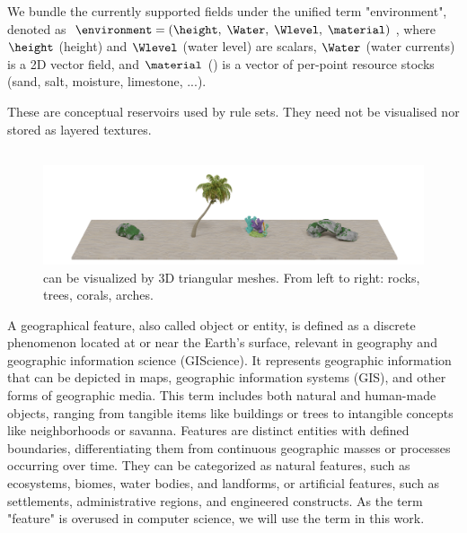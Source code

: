 We bundle the currently supported fields under the unified term "environment", denoted as $\environment = (\height,\; \Water,\; \Wlevel,\; \material)$,  
where $\height$ (height) and $\Wlevel$ (water level) are scalars, $\Water$ (water currents) is a 2D vector field, and $\material$ () is a vector of per-point resource stocks (sand, salt, moisture, limestone, ...). 

These  are conceptual reservoirs used by rule sets. They need not be visualised nor stored as layered textures.

\subsection{}
\label{sec:env-obj-environmental-objects}

\begin{figure}
    \includegraphics{assets-demo.pdf}
    \caption{ can be visualized by 3D triangular meshes. From left to right: rocks, trees, corals, arches.}
    \label{fig:env-obj-assets}
\end{figure}

A geographical feature, also called object or entity, is defined as a discrete phenomenon located at or near the Earth's surface, relevant in geography and geographic information science (GIScience). It represents geographic information that can be depicted in maps, geographic information systems (GIS), and other forms of geographic media. This term includes both natural and human-made objects, ranging from tangible items like buildings or trees to intangible concepts like neighborhoods or savanna. Features are distinct entities with defined boundaries, differentiating them from continuous geographic masses or processes occurring over time. They can be categorized as natural features, such as ecosystems, biomes, water bodies, and landforms, or artificial features, such as settlements, administrative regions, and engineered constructs. As the term "feature" is overused in computer science, we will use the term  in this work.

